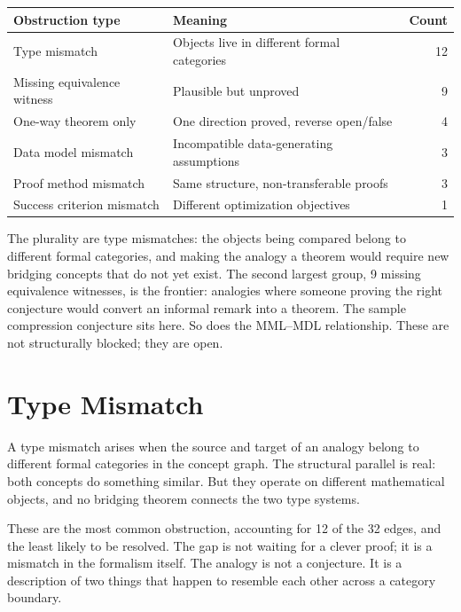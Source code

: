 \begin{center}\small
\begin{tabular}{llr}
\toprule
\textbf{Obstruction type} & \textbf{Meaning} & \textbf{Count} \\
\midrule
Type mismatch & Objects live in different formal categories & 12 \\
Missing equivalence witness & Plausible but unproved & 9 \\
One-way theorem only & One direction proved, reverse open/false & 4 \\
Data model mismatch & Incompatible data-generating assumptions & 3 \\
Proof method mismatch & Same structure, non-transferable proofs & 3 \\
Success criterion mismatch & Different optimization objectives & 1 \\
\bottomrule
\end{tabular}
\end{center}

The plurality are type mismatches: the objects being compared belong to
different formal categories, and making the analogy a theorem would require
new bridging concepts that do not yet exist. The second largest group, 9
missing equivalence witnesses, is the frontier: analogies where someone
proving the right conjecture would convert an informal remark into a
theorem. The sample compression conjecture sits here. So does the
MML--MDL relationship. These are not structurally blocked; they are open.



\section{Type Mismatch}
\label{sec:type-mismatch}

A type mismatch arises when the source and target of an analogy belong
to different formal categories in the concept graph. The structural
parallel is real: both concepts do something similar. But they operate on
different mathematical objects, and no bridging theorem connects the two
type systems.

These are the most common obstruction, accounting for 12 of the 32 edges,
and the least likely to be resolved. The gap is not waiting for a clever
proof; it is a mismatch in the formalism itself. The analogy is not a
conjecture. It is a description of two things that happen to resemble each
other across a category boundary.

